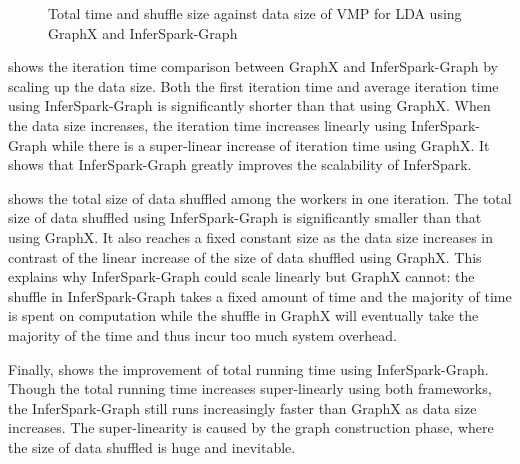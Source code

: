 \begin{figure}[h]
\centering
	\caption{Total time and shuffle size against data size of VMP for LDA using GraphX and InferSpark-Graph}
\end{figure}

 shows the iteration time
comparison between GraphX and InferSpark-Graph by scaling up the data size.
Both the first iteration time and average iteration time 
using InferSpark-Graph is significantly shorter than that using
GraphX. When the data size increases, the iteration time increases linearly
using InferSpark-Graph while there is a super-linear increase of iteration
time using GraphX. It shows that InferSpark-Graph greatly improves the
scalability of InferSpark.

 shows the total size of data
shuffled among the workers in one iteration. The total size of data shuffled
using InferSpark-Graph is significantly smaller than that using GraphX. It
also reaches a fixed constant size as the data size increases in contrast of
the linear increase of the size of data shuffled using GraphX. This explains
why InferSpark-Graph could scale linearly but GraphX cannot: the shuffle in
InferSpark-Graph takes a fixed amount of time and the majority of time is
spent on computation while the shuffle in GraphX will eventually take the
majority of the time and thus incur too much system overhead.

Finally,  shows the improvement of
total running time using InferSpark-Graph. Though the total running time
increases super-linearly using both frameworks, the InferSpark-Graph still
runs increasingly faster than GraphX as data size increases. The
super-linearity is caused by the graph construction phase, where the size of
data shuffled is huge and inevitable.

